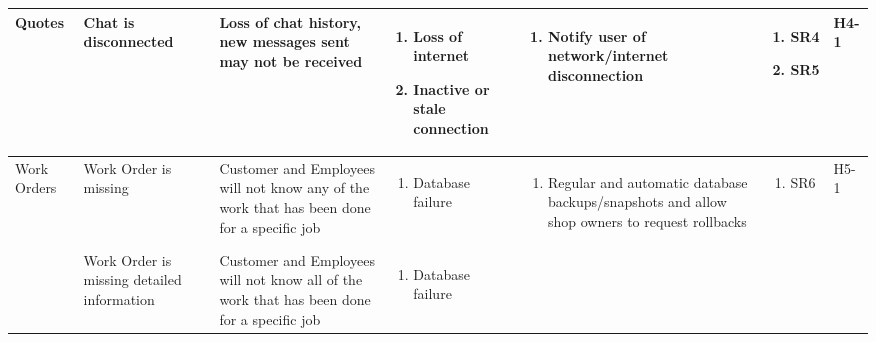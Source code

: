 \documentclass{article}
\begin{document}
\begin{landscape}
\begin{longtable}{|p{}|p{}|p{}|p{}|p{}|p{}|p{}|}
		\hline
		Quotes
		 & Chat is disconnected
		 & Loss of chat history, new messages sent may not be received
		 & \begin{enumerate}[label=\alph*., leftmargin=*]
			   \item Loss of internet
			   \item Inactive or stale connection
		   \end{enumerate}
		 & \begin{enumerate}[label=\alph*., leftmargin=*]
			   \item Notify user of network/internet disconnection
		   \end{enumerate}
		 & \begin{enumerate}[label=\alph*., leftmargin=*]
			   \item SR4
			   \item SR5
		   \end{enumerate}
		 & H4-1                                                                                                         \\
		\hline
		\multirow{2}{*}{Work Orders}
		 & Work Order is missing
		 & Customer and Employees will not know any of the work that has been done for a specific job
		 & \begin{enumerate}[label=\alph*., leftmargin=*]
			   \item Database failure
		   \end{enumerate}
		 & \begin{enumerate}[label=\alph*., leftmargin=*]
			   \item Regular and automatic database backups/snapshots and allow shop owners to request rollbacks
		   \end{enumerate}
		 & \begin{enumerate}[label=\alph*., leftmargin=*]
			   \item SR6
		   \end{enumerate}
		 & H5-1                                                                                                         \\
		\cline{2-7}
		~
		 & Work Order is missing detailed information
		 & Customer and Employees will not know all of the work that has been done for a specific job
		 & \begin{enumerate}[label=\alph*., leftmargin=*]
			   \item Database failure

\end{enumerate}
\end{longtable}
\end{landscape}
\end{document}
